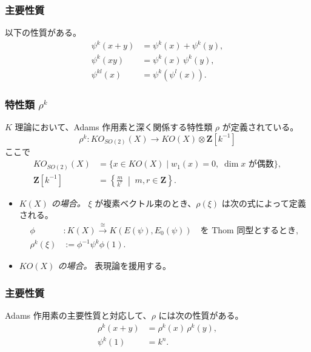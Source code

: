 \documentclass[uplatex,dvipdfmx,a4paper,12pt]{jlreq}
\newcommand{\Z}{\mathbf{Z}}
\begin{document}
\subsubsection{主要性質}

以下の性質がある。
\begin{align*}
  \psi^k(x + y)  &= \psi^k(x) + \psi^k(y), \\
  \psi^k(xy)     &= \psi^k(x)\,\psi^k(y), \\
  \psi^{kl}(x)   &= \psi^k(\psi^l(x)).
\end{align*}

\subsubsection{特性類 $\rho^k$}

$K$ 理論において、Adams 作用素と深く関係する特性類 $\rho$ が定義されている。
\[
  \rho^k : KO_{SO(2)}(X) \longrightarrow KO(X) \otimes \Z[k^{-1}]
\]
ここで
\begin{align*}
  KO_{SO(2)}(X) &= \{ x \in KO(X) \mid w_1(x) = 0,\; \dim x \text{ が偶数}\}, \\
  \Z[k^{-1}]    &= \left\{ \frac{m}{k^r} \;\middle|\; m, r \in \Z \right\}.
\end{align*}

\begin{itemize}
  \item \textit{$K(X)$ の場合。}
        $\xi$ が複素ベクトル束のとき、$\rho(\xi)$ は次の式によって定義される。
        \begin{align*}
          \phi &: K(X) \stackrel{\cong}{\longrightarrow}
                K(E(\psi), E_0(\psi)) \quad \text{を Thom 同型とするとき}, \\
          \rho^k(\xi) &:= \phi^{-1} \psi^k \phi(1).
        \end{align*}
  \item \textit{$KO(X)$ の場合。}
        表現論を援用する。
\end{itemize}

\subsubsection{主要性質}

Adams 作用素の主要性質と対応して、$\rho$ には次の性質がある。
\begin{align*}
  \rho^k(x + y) &= \rho^k(x)\,\rho^k(y), \\
  \psi^k(1)     &= k^n.
\end{align*}
\end{document}
